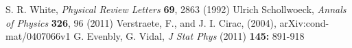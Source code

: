 \documentclass[english]{article}
\begin{document}
\begin{thebibliography}{99}
 S. R. White, {\it Physical Review Letters} {\bf 69}, 2863 (1992)
 Ulrich Schollwoeck, {\it Annals of Physics} {\bf 326}, 96 (2011)
 Verstraete, F., and J. I. Cirac, (2004), arXiv:cond-mat/0407066v1
G. Evenbly, G. Vidal, {\it J Stat Phys} (2011) {\bf 145:} 891-918
\end{thebibliography}
\end{document}
